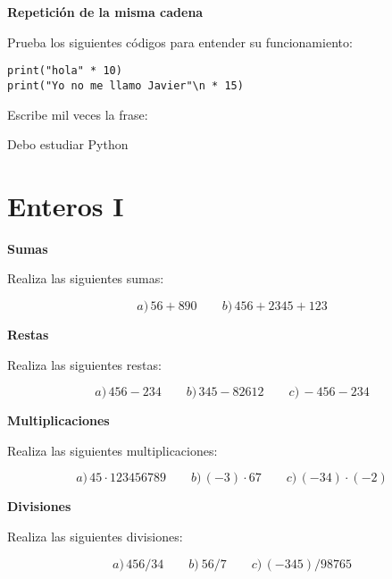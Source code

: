 \documentclass[a4paper, 11pt]{scrartcl}
\newenvironment{code}{\begin{tcolorbox}[colback=red!2!white]}{\end{tcolorbox}}
\begin{document}
\noindent\textbf{\sffamily \dag{} Repetición de la misma cadena}

 Prueba los siguientes códigos para entender su funcionamiento:
 \smallskip
 
 \begin{code}

\begin{verbatim}
print("hola" * 10)
print("Yo no me llamo Javier"\n * 15)
\end{verbatim}

\end{code}

Escribe mil veces la frase: 

\begin{center}
Debo estudiar Python
\end{center}



\newpage


\section{Enteros I}





\noindent\textbf{\sffamily Sumas}

Realiza las siguientes sumas:

$$
a)\, 56+890 \qquad b)\, 456 + 2345 + 123
$$





\noindent\textbf{\sffamily Restas}

Realiza las siguientes restas:

$$
a)\, 456 - 234 \qquad b)\, 345 - 82612 \qquad c)\, -456 - 234
$$





\noindent\textbf{\sffamily Multiplicaciones}

Realiza las siguientes multiplicaciones:

$$
a)\,45 \cdot 123456789 \qquad b)\,(-3) \cdot 67 \qquad c)\, (-34) \cdot (-2)
$$





\noindent\textbf{\sffamily Divisiones}

Realiza las siguientes divisiones:


$$
a)\, 456 / 34 \qquad b)\ 56/7\qquad  c)\, (-345) / 98765
$$
\end{document}
